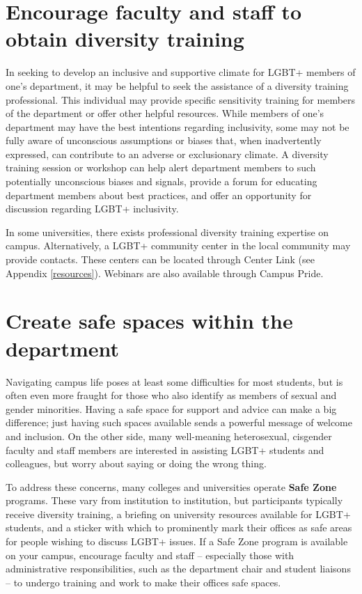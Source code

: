 \section {Encourage faculty and staff to obtain diversity training}
\label{diversity-training}
In seeking to develop an inclusive and supportive climate for LGBT+ members of one's department, it may be helpful to seek the assistance of a diversity training professional. This individual may provide specific sensitivity training for members of the department or offer other helpful resources. While members of one's department may have the best intentions regarding inclusivity, some may not be fully aware of unconscious assumptions or biases that, when inadvertently expressed, can contribute to an adverse or exclusionary climate. A diversity training session or workshop can help alert department members to such potentially unconscious biases and signals, provide a forum for educating department members about best practices, and offer an opportunity for discussion regarding LGBT+ inclusivity.

In some universities, there exists professional diversity training expertise on campus. Alternatively, a LGBT+ community center in the local community may provide contacts. These centers can be located through Center Link (see Appendix \ref{resources}). Webinars are also available through Campus Pride.


\section {Create safe spaces within the department}
\label{safe-spaces}
Navigating campus life poses at least some difficulties for most students, but is often even more fraught for those who also identify as members of sexual and gender minorities. Having a safe space for support and advice can make a big difference; just having such spaces available sends a powerful message of welcome and inclusion. On the other side, many well-meaning heterosexual, cisgender faculty and staff members are interested in assisting LGBT+ students and colleagues, but worry about saying or doing the wrong thing.

To address these concerns, many colleges and universities operate \textbf{Safe Zone} programs. These vary from institution to institution, but participants typically receive diversity training, a briefing on university resources available for LGBT+ students, and a sticker with which to prominently mark their offices as safe areas for people wishing to discuss LGBT+ issues. If a Safe Zone program is available on your campus, encourage faculty and staff -- especially those with administrative responsibilities, such as the department chair and student liaisons -- to undergo training and work to make their offices safe spaces.


